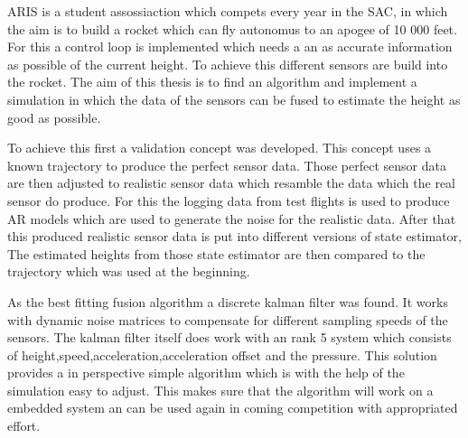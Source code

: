 ARIS is a student assossiaction which compets every year in the SAC,
in which the aim is to build a rocket which can fly autonomus to an apogee of 10 000 feet.
For this a control loop is implemented which needs a an as accurate information as possible of the current height.
To achieve this different sensors are build into the rocket.
The aim of this thesis is to find an algorithm and implement a simulation in which the data of the sensors can be fused to estimate the height as good as possible.


To achieve this first a validation concept was developed. 
This concept uses a known trajectory to produce the perfect sensor data.
Those perfect sensor data are then adjusted to realistic sensor data which resamble the data which the real sensor do produce.
For this the logging data from test flights is used to produce AR models which are used to generate the noise for the realistic data.
After that this produced realistic sensor data is put into different versions of state estimator,
The estimated heights from those state estimator are then compared to the trajectory which was used at the beginning.


As the best fitting fusion algorithm a discrete kalman filter was found.
It works with dynamic noise matrices to compensate for different sampling speeds of the sensors.
The kalman filter itself does work with an rank 5 system which consists of height,speed,acceleration,acceleration offset and the pressure.
This solution provides a in perspective simple algorithm which is with the help of the simulation easy to adjust.
This makes sure that the algorithm will work on a embedded system an can be used again in coming competition with appropriated effort.